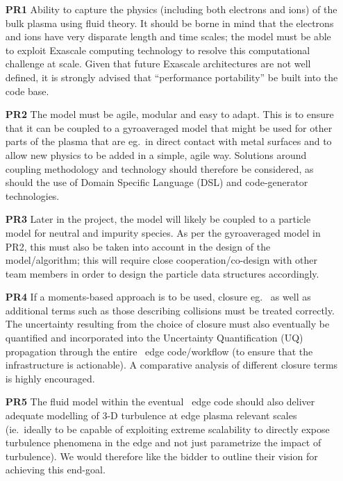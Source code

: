 \begin{itemize}
\item[\textbf{PR1}] Ability to capture the physics (including both electrons and ions) 
of the bulk plasma using fluid theory. It should be borne in mind that the electrons 
and ions have very disparate length and time scales; the model must be able to 
exploit Exascale computing technology to resolve this computational challenge at 
scale. Given that future Exascale architectures are not well defined, it is strongly 
advised that ``performance portability'' be built into the code base.

\item[\textbf{PR2}] The model must be agile, modular and easy to adapt. This is to ensure 
that it can be coupled to a gyroaveraged model that might be used for other parts 
of the plasma that are eg.\ in direct contact with metal surfaces and to allow 
new physics to be added in a simple, agile way. Solutions around coupling methodology 
and technology should therefore be considered, as should the use of Domain Specific 
Language (DSL) and code-generator technologies.

\item[\textbf{PR3}] Later in the project, the model will likely be coupled to a particle 
model for neutral and impurity species. As per the gyroaveraged model in PR2, this must also 
be taken into account in the design of the model/algorithm; this will require close 
cooperation/co-design with other team members in order to design the particle data 
structures accordingly.

\item[\textbf{PR4}] If a moments-based approach is to be used, closure eg.\ \cite{Ca10Tran,Vo91Flui} as well 
as additional terms such as those describing collisions must be treated correctly. 
The uncertainty resulting from the choice of closure must also eventually be quantified 
and incorporated into the Uncertainty Quantification (UQ) propagation through the 
entire \nep \   edge code/workflow (to ensure that the infrastructure is actionable). 
A comparative analysis of different closure terms is highly encouraged.

\item[\textbf{PR5}] The fluid model within the eventual \nep \   edge code should also 
deliver adequate modelling of 3-D turbulence at edge plasma relevant scales (ie.\  
ideally to be capable of exploiting extreme scalability to directly expose turbulence 
phenomena in the edge and not just parametrize the impact of turbulence). We would 
therefore like the bidder to outline their vision for achieving this end-goal.
\end{itemize}


